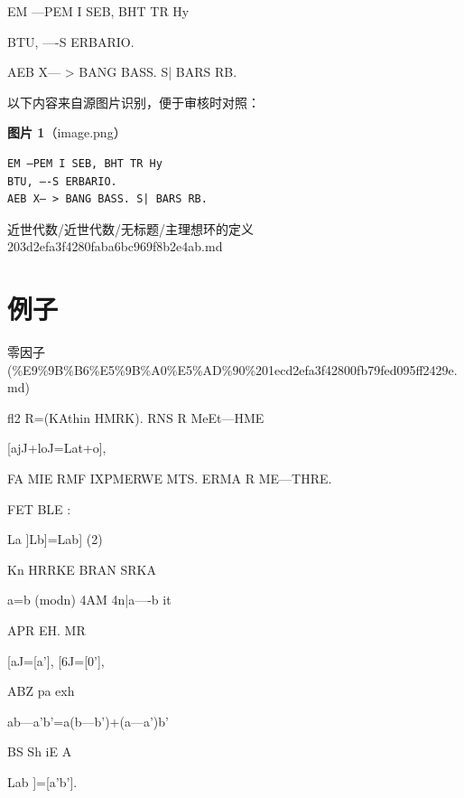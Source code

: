 \begin{definition}[主理想环的定义]

EM —PEM I SEB, BHT TR Hy

BTU, —-S ERBARIO.

AEB X— > BANG BASS. S| BARS RB.

\end{definition}

\begin{note}
以下内容来自源图片识别，便于审核时对照：

\textbf{图片 1}（image.png）
\begin{Verbatim}[fontsize=\small]
EM —PEM I SEB, BHT TR Hy
BTU, —-S ERBARIO.
AEB X— > BANG BASS. S| BARS RB.
\end{Verbatim}

\end{note}

\begin{note}[来源路径]

近世代数/近世代数/无标题/主理想环的定义 203d2efa3f4280faba6bc969f8b2e4ab.md

\end{note}

\section*{例子}

\begin{note}[来源上级主题]

零因子 (\%E9\%9B\%B6\%E5\%9B\%A0\%E5\%AD\%90\%201ecd2efa3f42800fb79fed095ff2429e.md)

\end{note}

\begin{example}[例子]

fl2 R=(KAthin HMRK). RNS R MeEt—HME

[ajJ+loJ=Lat+o],

FA MIE RMF IXPMERWE MTS. ERMA R ME—THRE.

FET BLE :

La ]Lb]=Lab]                            (2)

Kn HRRKE BRAN SRKA

a=b (modn) 4AM 4n|a—-b it

APR EH. MR

[aJ=[a’], [6J=[0'],

ABZ pa exh

ab—a’b’=a(b—b')+(a—a’)b’

BS Sh iE A

Lab ]=[a’b’].

\end{example}

